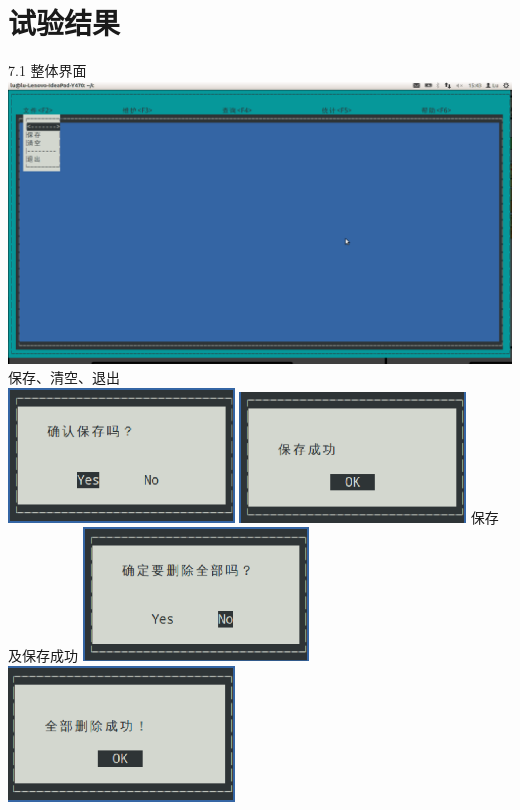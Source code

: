 \documentclass[10pt,a4paper]{article}
\begin{document}
\section{试验结果}
7.1 整体界面 \\
\includegraphics[width=14cm]{p1}
 保存、清空、退出 \\
\includegraphics[width=6cm]{save}
\includegraphics[width=6cm]{saves}
\newline
保存及保存成功
\newline
\includegraphics[width=6cm]{clear}
\includegraphics[width=6cm]{clears}
\end{document}

